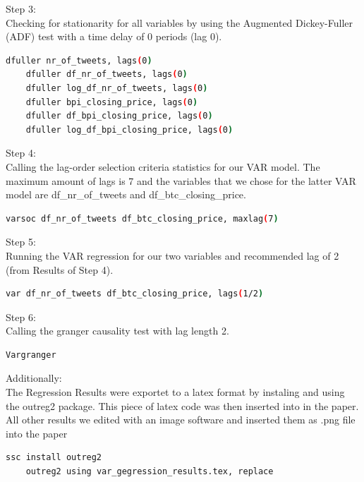 \documentclass[a4paper,12pt]{article}
\begin{document}
\begin{spacing}{1.2}
\smallskip Step 3:\\
Checking for stationarity for all variables by using the Augmented Dickey-Fuller (ADF) test with a time delay of 0 periods (lag 0).\\
	\begin{lstlisting}[language=bash]
	dfuller nr_of_tweets, lags(0)
	dfuller df_nr_of_tweets, lags(0)
	dfuller log_df_nr_of_tweets, lags(0)
	dfuller bpi_closing_price, lags(0)
	dfuller df_bpi_closing_price, lags(0)
	dfuller log_df_bpi_closing_price, lags(0)
	\end{lstlisting}

\smallskip Step 4:\\
Calling the lag-order selection criteria statistics for our VAR model. The maximum amount of lags is 7 and the variables that we chose for the latter VAR model are df\_nr\_of\_tweets and df\_btc\_closing\_price.\\
	\begin{lstlisting}[language=bash]
	varsoc df_nr_of_tweets df_btc_closing_price, maxlag(7)
	\end{lstlisting}

\smallskip Step 5:\\
Running the VAR regression for our two variables and recommended lag of 2 (from Results of Step 4).\\
	\begin{lstlisting}[language=bash]
	var df_nr_of_tweets df_btc_closing_price, lags(1/2)
	\end{lstlisting}

\smallskip Step 6:\\
Calling the granger causality test with lag length 2.\\
	\begin{lstlisting}[language=bash]
	Vargranger
	\end{lstlisting}

\smallskip Additionally:\\
The Regression Results were exportet to a latex format by instaling and using the outreg2 package. This piece of latex code was then inserted into in the paper. All other results we edited with an image software and inserted them as .png file into the paper\\
	\begin{lstlisting}[language=bash]
	ssc install outreg2
	outreg2 using var_gegression_results.tex, replace
	\end{lstlisting}

\end{spacing}
\clearpage
\end{document}
